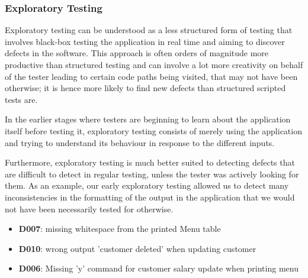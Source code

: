 \subsubsection{Exploratory Testing}

Exploratory testing can be understood as a less structured form of testing that involves black-box testing the application in real time and aiming to discover defects in the software. 
This approach is often orders of magnitude more productive than structured testing and can involve a lot more creativity on behalf of the tester leading to certain code paths being visited, that may not have been otherwise; it is hence more likely to find new defects than structured scripted tests are.
\par
In the earlier stages where testers are beginning to learn about the application itself before testing it, exploratory testing consists of merely using the application and trying to understand its behaviour in response to the different inputs. 
\par
Furthermore, exploratory testing is much better suited to detecting defects that are difficult to detect in regular testing, unless the tester was actively looking for them. 
As an example, our early exploratory testing allowed us to detect many inconsistencies in the formatting of the output in the application that we would not have been necessarily tested for otherwise.  

\begin{itemize}
    \item \textbf{D007}: missing whitespace from the printed Menu table
    \item \textbf{D010}: wrong output 'customer deleted' when updating customer
    \item \textbf{D006}: Missing 'y' command for customer salary update when printing menu
\end{itemize}